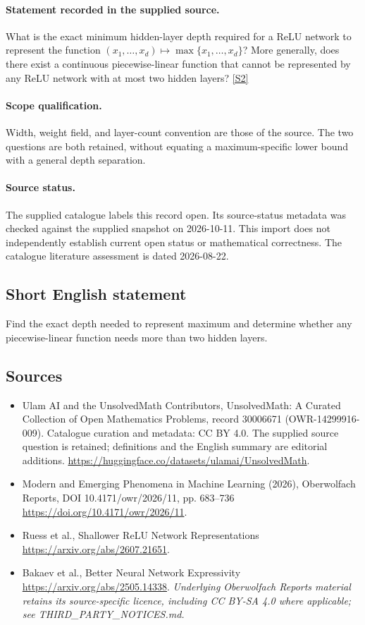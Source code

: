 \documentclass[11pt]{article}
\begin{document}
\paragraph{Statement recorded in the supplied source.}
What is the exact minimum hidden-layer depth required for a ReLU network to represent the function $(x_1,\ldots,x_d)\mapsto\max\{x_1,\ldots,x_d\}$? More generally, does there exist a continuous piecewise-linear function that cannot be represented by any ReLU network with at most two hidden layers? \href{https://doi.org/10.4171/owr/2026/11}{[S2]}
\paragraph{Scope qualification.}
Width, weight field, and layer-count convention are those of the source. The two questions are both retained, without equating a maximum-specific lower bound with a general depth separation.
\paragraph{Source status.}
The supplied catalogue labels this record open. Its source-status metadata was checked against the supplied snapshot on 2026-10-11. This import does not independently establish current open status or mathematical correctness. The catalogue literature assessment is dated 2026-08-22.
\subsection{Short English statement}
Find the exact depth needed to represent maximum and determine whether any piecewise-linear function needs more than two hidden layers.
\subsection{Sources}
\begin{itemize}
\item[S1] Ulam AI and the UnsolvedMath Contributors, UnsolvedMath: A Curated Collection of Open Mathematics Problems, record 30006671 (OWR-14299916-009). Catalogue curation and metadata: CC BY 4.0. The supplied source question is retained; definitions and the English summary are editorial additions.
\url{https://huggingface.co/datasets/ulamai/UnsolvedMath}.
\item[S2] Modern and Emerging Phenomena in Machine Learning (2026), Oberwolfach Reports, DOI 10.4171/owr/2026/11, pp. 683--736
\url{https://doi.org/10.4171/owr/2026/11}.
\item[S3] Ruess et al., Shallower ReLU Network Representations
\url{https://arxiv.org/abs/2607.21651}.
\item[S4] Bakaev et al., Better Neural Network Expressivity
\url{https://arxiv.org/abs/2505.14338}.
\textit{Underlying Oberwolfach Reports material retains its source-specific licence, including CC BY-SA 4.0 where applicable; see THIRD\_PARTY\_NOTICES.md.}
\end{itemize}
\end{document}
